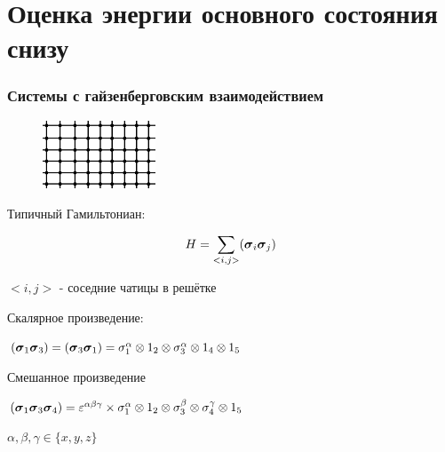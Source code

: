 \documentclass{beamer}
\begin{document}
\section{Оценка энергии основного состояния снизу}%
\begin{frame}
\frametitle{Системы с гайзенберговским взаимодействием}
\begin{figure}
\includegraphics[width=0.3\textwidth]{lattice.png}
\end{figure}

\begin{center}Типичный Гамильтониан:\end{center}
$$H=\sum_{<i,j>}({\boldsymbol{\sigma}}_i {\boldsymbol{\sigma}}_j)$$

$<i,j>$ - соседние чатицы в решётке






Скалярное произведение: 

$({\boldsymbol{\sigma}}_1{\boldsymbol{\sigma}}_3) = ({\boldsymbol{\sigma}}_3{\boldsymbol{\sigma}}_1) = \sigma_1^\alpha\otimes 1_2\otimes\sigma_3^\alpha \otimes 1_4 \otimes 1_5 $%

Смешанное произведение 

$({\boldsymbol{\sigma}}_1{\boldsymbol{\sigma}}_3{\boldsymbol{\sigma}}_4) = 
\varepsilon^{\alpha\beta\gamma} \times \sigma_1^\alpha\otimes 1_2\otimes\sigma_3^\beta\otimes \sigma_4^\gamma \otimes 1_5 $

$\alpha,\beta,\gamma \in \{x,y,z\}$

\end{frame}

\end{document}

